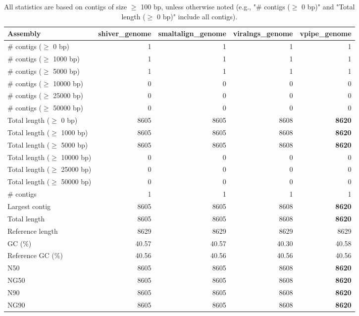\documentclass[12pt,a4paper]{article}
\begin{document}
\begin{table}[ht]
\begin{center}
\caption{All statistics are based on contigs of size $\geq$ 100 bp, unless otherwise noted (e.g., "\# contigs ($\geq$ 0 bp)" and "Total length ($\geq$ 0 bp)" include all contigs).}
\begin{tabular}{|l*{4}{|r}|}
\hline
Assembly & shiver\_genome & smaltalign\_genome & viralngs\_genome & vpipe\_genome \\ \hline
\# contigs ($\geq$ 0 bp) & 1 & 1 & 1 & 1 \\ \hline
\# contigs ($\geq$ 1000 bp) & 1 & 1 & 1 & 1 \\ \hline
\# contigs ($\geq$ 5000 bp) & 1 & 1 & 1 & 1 \\ \hline
\# contigs ($\geq$ 10000 bp) & 0 & 0 & 0 & 0 \\ \hline
\# contigs ($\geq$ 25000 bp) & 0 & 0 & 0 & 0 \\ \hline
\# contigs ($\geq$ 50000 bp) & 0 & 0 & 0 & 0 \\ \hline
Total length ($\geq$ 0 bp) & 8605 & 8605 & 8608 & {\bf 8620} \\ \hline
Total length ($\geq$ 1000 bp) & 8605 & 8605 & 8608 & {\bf 8620} \\ \hline
Total length ($\geq$ 5000 bp) & 8605 & 8605 & 8608 & {\bf 8620} \\ \hline
Total length ($\geq$ 10000 bp) & 0 & 0 & 0 & 0 \\ \hline
Total length ($\geq$ 25000 bp) & 0 & 0 & 0 & 0 \\ \hline
Total length ($\geq$ 50000 bp) & 0 & 0 & 0 & 0 \\ \hline
\# contigs & 1 & 1 & 1 & 1 \\ \hline
Largest contig & 8605 & 8605 & 8608 & {\bf 8620} \\ \hline
Total length & 8605 & 8605 & 8608 & {\bf 8620} \\ \hline
Reference length & 8629 & 8629 & 8629 & 8629 \\ \hline
GC (\%) & 40.57 & 40.57 & 40.30 & 40.58 \\ \hline
Reference GC (\%) & 40.56 & 40.56 & 40.56 & 40.56 \\ \hline
N50 & 8605 & 8605 & 8608 & {\bf 8620} \\ \hline
NG50 & 8605 & 8605 & 8608 & {\bf 8620} \\ \hline
N90 & 8605 & 8605 & 8608 & {\bf 8620} \\ \hline
NG90 & 8605 & 8605 & 8608 & {\bf 8620} \\ \hline

\end{tabular}
\end{center}
\end{table}
\end{document}
